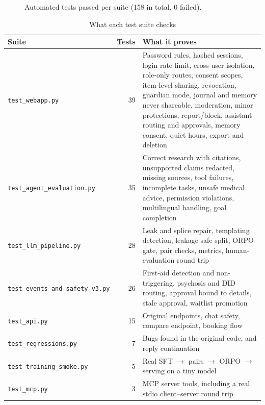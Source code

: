 \documentclass[11pt,a4paper]{article}
\newcommand{\code}[1]{\texttt{#1}}
\begin{document}
\begin{figure}[H]
\centering
{}
\caption{Automated tests passed per suite (158 in total, 0 failed).}
\label{fig:tests}
\end{figure}

\begin{table}[H]
\centering
\caption{What each test suite checks}
\label{tab:tests}
\small
\begin{tabularx}{\textwidth}{@{}lrY@{}}
\toprule
\textbf{Suite} & \textbf{Tests} & \textbf{What it proves}\\
\midrule
\code{test\_webapp.py} & 39 & Password rules, hashed sessions, login rate limit, cross-user isolation, role-only routes, consent scopes, item-level sharing, revocation, guardian mode, journal and memory never shareable, moderation, minor protections, report/block, assistant routing and approvals, memory consent, quiet hours, export and deletion\\
\code{test\_agent\_evaluation.py} & 35 & Correct research with citations, unsupported claims redacted, missing sources, tool failures, incomplete tasks, unsafe medical advice, permission violations, multilingual handling, goal completion\\
\code{test\_llm\_pipeline.py} & 28 & Leak and splice repair, templating detection, leakage-safe split, ORPO gate, pair checks, metrics, human-evaluation round trip\\
\code{test\_events\_and\_safety\_v3.py} & 26 & First-aid detection and non-triggering, psychosis and DID routing, approval bound to details, stale approval, waitlist promotion\\
\code{test\_api.py} & 15 & Original endpoints, chat safety, compare endpoint, booking flow\\
\code{test\_regressions.py} & 7 & Bugs found in the original code, and reply continuation\\
\code{test\_training\_smoke.py} & 5 & Real SFT $\rightarrow$ pairs $\rightarrow$ ORPO $\rightarrow$ serving on a tiny model\\
\code{test\_mcp.py} & 3 & MCP server tools, including a real stdio client--server round trip\\
\bottomrule
\end{tabularx}
\end{table}
\end{document}
